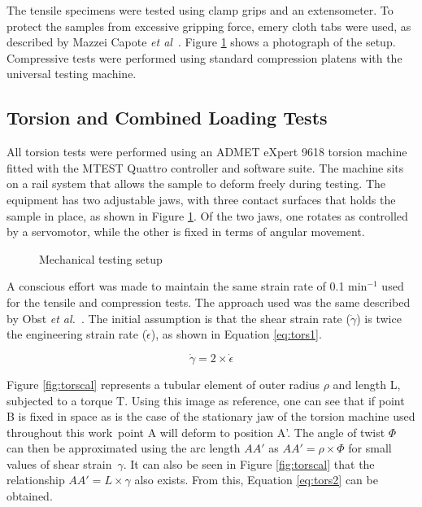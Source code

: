 \documentclass[main.tex]{subfiles}
\begin{document}
The tensile specimens were tested using clamp grips and an extensometer. To protect the samples from excessive gripping force, emery cloth tabs were used, as described by Mazzei Capote \emph{et al}~\cite{Capote2017}. Figure \ref{fig:testsetup} shows a photograph of the setup. Compressive tests were performed using standard compression platens with the universal testing machine. 
    
\subsection{Torsion and Combined Loading Tests}

All torsion tests were performed using an ADMET eXpert 9618 torsion machine fitted with the MTEST Quattro controller and software suite. The machine sits on a rail system that allows the sample to deform freely during testing. The equipment has two adjustable jaws, with three contact surfaces that holds the sample in place, as shown in Figure \ref{fig:testsetup}. Of the two jaws, one rotates as controlled by a servomotor, while the other is fixed in terms of angular movement. 

\begin{figure}[h]
	\center
	\hfill
	\caption{Mechanical testing setup} \label{fig:testsetup}
\end{figure} 

A conscious effort was made to maintain the same strain rate of 0.1 min$^{-1}$ used for the tensile and compression tests. The approach used was the same described by Obst \emph{et al.}~\cite{Obst2018}. The initial assumption is that the shear strain rate ($\dot{\gamma}$) is twice the engineering strain rate ($\dot{\epsilon}$), as shown in Equation \ref{eq:tors1}.

\begin{equation}\label{eq:tors1}
\dot{\gamma}= 2 \times \dot{\epsilon} 
\end{equation}

Figure \ref{fig:torscal} represents a tubular element of outer radius $\rho$ and length L, subjected to a torque T. Using this image as reference, one can see that if point B is fixed in space \textemdash as is the case of the stationary jaw of the torsion machine used throughout this work~\textemdash point A will deform to position A'. The angle of twist $\Phi$ can then be approximated using the arc length $AA'$ as $AA'=\rho \times \Phi$ for small values of shear strain~$\gamma$. It can also be seen in Figure \ref{fig:torscal} that the relationship $AA'=L\times \gamma$ also exists. From this, Equation \ref{eq:tors2} can be obtained.
\end{document}
